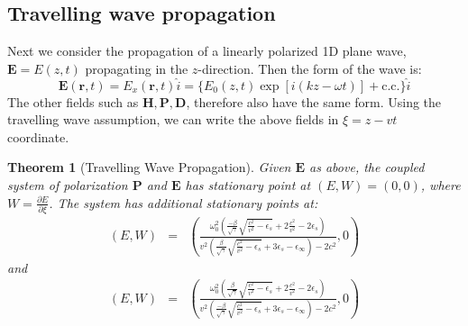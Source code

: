 \documentclass{article}[12pt]
\theoremstyle{plain}
\newtheorem{thm}{Theorem}
\begin{document}
\subsection{Travelling wave propagation}
\label{subsec:plane-wave}
Next we consider the propagation of a linearly polarized 1D plane wave, $\mathbf{E}=E(z,t)$ propagating
in the $z$-direction. 
Then the form of the wave is:
\[
\mathbf{E}(\mathbf{r},t) = E_x(\mathbf{r},t)\hat{i} = \{E_0(z,t)\exp[i(kz-\omega t)]+\mathrm{c.c.}\}\hat{i}
\]
The other fields such as $\mathbf{H},\mathbf{P},\mathbf{D}$, therefore also have
the same form. Using the travelling wave assumption, we can write the above fields in $\xi=z-vt$ 
coordinate. 
\begin{thm}[Travelling Wave Propagation]
Given $\mathbf{E}$ as above, the coupled system of polarization $\mathbf{P}$ and $\mathbf{E}$ has
stationary point at $(E,W)=(0,0)$, where $W=\frac{\partial E}{\partial \xi}$.
The system has additional stationary points at:
\begin{eqnarray}
(E,W) & = & (\frac{\omega_0^2 (\frac{-\beta}{\sqrt{\gamma}}\sqrt{\frac{c^2}{v^2}-\epsilon_s} + 2\frac{c^2}{v^2} - 2\epsilon_s)}
{v^2(\frac{\beta}{\sqrt{\gamma}}\sqrt{\frac{c^2}{v^2}-\epsilon_s} + 3\epsilon_s - \epsilon_\infty) - 2c^2},0)
\end{eqnarray}
and
\begin{eqnarray}
(E,W) & = & (\frac{\omega_0^2 (\frac{\beta}{\sqrt{\gamma}}\sqrt{\frac{c^2}{v^2}-\epsilon_s} + 2\frac{c^2}{v^2} - 2\epsilon_s)}
{v^2(\frac{-\beta}{\sqrt{\gamma}}\sqrt{\frac{c^2}{v^2}-\epsilon_s} + 3\epsilon_s - \epsilon_\infty) - 2c^2},0)
\end{eqnarray}
\end{thm}
\end{document}
